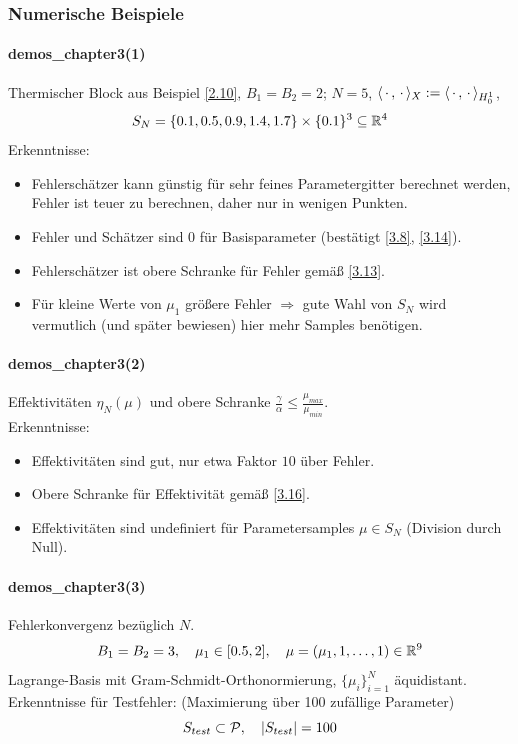 \subsubsection*{Numerische Beispiele}

\paragraph*{demos\_chapter3(1)} Thermischer Block aus Beispiel \ref{2.10}, $B_1 = B_2 = 2$; $N = 5$, $\langle \,\cdot\,, \,\cdot\, \rangle_X := \langle \,\cdot\,, \,\cdot\, \rangle_{H_0^1}$,
\[
	S_N = \{ 0.1, 0.5, 0.9, 1.4, 1.7 \} \times \{0.1\}^3 \subseteq \mathbb{R}^4
\]
Erkenntnisse:
\begin{itemize}
	\item Fehlerschätzer kann günstig für sehr feines Parametergitter berechnet werden, Fehler ist teuer zu berechnen, daher nur in wenigen Punkten.
	\item Fehler und Schätzer sind $0$ für Basisparameter (bestätigt \ref{3.8}, \ref{3.14}).
	\item Fehlerschätzer ist obere Schranke für Fehler gemäß \ref{3.13}.
	\item Für kleine Werte von $\mu_1$ größere Fehler $\Rightarrow$ gute Wahl von $S_N$ wird vermutlich (und später bewiesen) hier mehr Samples benötigen.
\end{itemize}

\paragraph*{demos\_chapter3(2)} Effektivitäten $\eta_N(\mu)$ und obere Schranke $\frac{\gamma}{\alpha} \leq \frac{\mu_{max}}{\mu_{min}}$.\\
Erkenntnisse:
\begin{itemize}
	\item Effektivitäten sind gut, nur etwa Faktor $10$ über Fehler.
	\item Obere Schranke für Effektivität gemäß \ref{3.16}.
	\item Effektivitäten sind undefiniert für Parametersamples $\mu \in S_N$ (Division durch Null).
\end{itemize}

\paragraph*{demos\_chapter3(3)} Fehlerkonvergenz bezüglich $N$.
\[
	B_1 = B_2 = 3, \quad \mu_1 \in [0.5,2], \quad \mu = (\mu_1,1,\dots,1) \in \mathbb{R}^9
\]
Lagrange-Basis mit Gram-Schmidt-Orthonormierung, $\{\mu_i\}_{i=1}^N$ äquidistant.
Erkenntnisse für Testfehler: (Maximierung über 100 zufällige Parameter)
\[
	S_{test} \subset \mathcal{P}, \quad |S_{test}| = 100
\]

